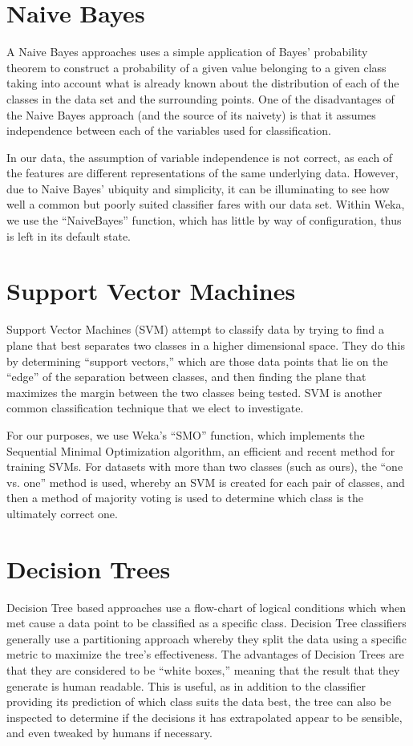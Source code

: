 \section{Naive Bayes}
A Naive Bayes approaches uses a simple application of Bayes' probability theorem to construct a probability of a given value belonging to a given class taking into account what is already known about the distribution of each of the classes in the data set and the surrounding points. One of the disadvantages of the Naive Bayes approach (and the source of its naivety) is that it assumes independence between each of the variables used for classification.

In our data, the assumption of variable independence is not correct, as each of the features are different representations of the same underlying data. However, due to Naive Bayes' ubiquity and simplicity, it can be illuminating to see how well a common but poorly suited classifier fares with our data set. Within Weka, we use the ``NaiveBayes'' function, which has little by way of configuration, thus is left in its default state.

\section{Support Vector Machines}
Support Vector Machines (SVM) attempt to classify data by trying to find a plane that best separates two classes in a higher dimensional space. They do this by determining ``support vectors,'' which are those data points that lie on the ``edge'' of the separation between classes, and then finding the plane that maximizes the margin between the two classes being tested. SVM is another common classification technique that we elect to investigate.

For our purposes, we use Weka's ``SMO'' function, which implements the Sequential Minimal Optimization algorithm, an efficient and recent method for training SVMs. For datasets with more than two classes (such as ours), the ``one vs. one'' method is used, whereby an SVM is created for each pair of classes, and then a method of majority voting is used to determine which class is the ultimately correct one.

\section{Decision Trees}
Decision Tree based approaches use a flow-chart of logical conditions which when met cause a data point to be classified as a specific class. Decision Tree classifiers generally use a partitioning approach whereby they split the data using a specific metric to maximize the tree's effectiveness. The advantages of Decision Trees are that they are considered to be ``white boxes,'' meaning that the result that they generate is human readable. This is useful, as in addition to the classifier providing its prediction of which class suits the data best, the tree can also be inspected to determine if the decisions it has extrapolated appear to be sensible, and even tweaked by humans if necessary.

